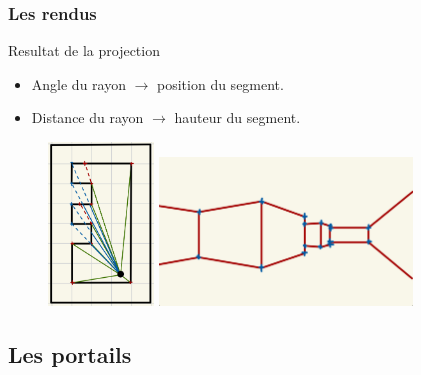 \documentclass{beamer}
\begin{document}
\begin{frame}
    \frametitle{Les rendus}
    \begin{block}{Resultat de la projection}
        \begin{itemize}
            \item Angle du rayon $\rightarrow$ position du segment.
            \item Distance du rayon $\rightarrow$ hauteur du segment.
        \end{itemize}
    \end{block}
    \begin{figure}
        \center
        \includegraphics[width=0.25\textwidth]{images/projection-2D-V2.jpeg}
        \raisebox{2cm}{
            \hspace{2mm}$\Longrightarrow$\hspace{2mm}
        }
        \includegraphics[width=0.6\textwidth]{images/rendu-points.jpeg}
    \end{figure}
\end{frame}

\subsection{Les portails}
\end{document}
